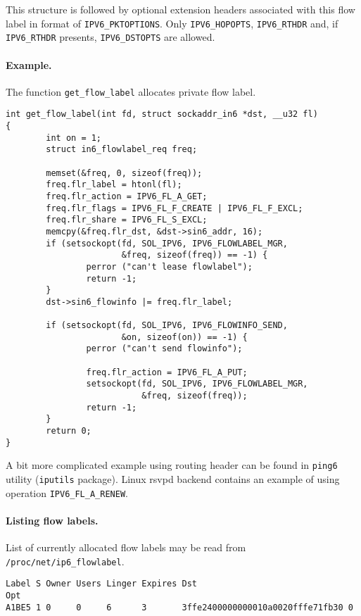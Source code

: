 This structure is followed by optional extension headers associated
with this flow label in format of \verb|IPV6_PKTOPTIONS|. Only
\verb|IPV6_HOPOPTS|, \verb|IPV6_RTHDR| and, if \verb|IPV6_RTHDR| presents,
\verb|IPV6_DSTOPTS| are allowed.

\paragraph{Example.}
 The function \verb|get_flow_label| allocates
private flow label.

\begin{verbatim}
int get_flow_label(int fd, struct sockaddr_in6 *dst, __u32 fl)
{
        int on = 1;
        struct in6_flowlabel_req freq;

        memset(&freq, 0, sizeof(freq));
        freq.flr_label = htonl(fl);
        freq.flr_action = IPV6_FL_A_GET;
        freq.flr_flags = IPV6_FL_F_CREATE | IPV6_FL_F_EXCL;
        freq.flr_share = IPV6_FL_S_EXCL;
        memcpy(&freq.flr_dst, &dst->sin6_addr, 16);
        if (setsockopt(fd, SOL_IPV6, IPV6_FLOWLABEL_MGR,
                       &freq, sizeof(freq)) == -1) {
                perror ("can't lease flowlabel");
                return -1;
        }
        dst->sin6_flowinfo |= freq.flr_label;

        if (setsockopt(fd, SOL_IPV6, IPV6_FLOWINFO_SEND,
                       &on, sizeof(on)) == -1) {
                perror ("can't send flowinfo");

                freq.flr_action = IPV6_FL_A_PUT;
                setsockopt(fd, SOL_IPV6, IPV6_FLOWLABEL_MGR,
                           &freq, sizeof(freq));
                return -1;
        }
        return 0;
}
\end{verbatim}

A bit more complicated example using routing header can be found
in \verb|ping6| utility (\verb|iputils| package). Linux rsvpd backend
contains an example of using operation \verb|IPV6_FL_A_RENEW|.

\paragraph{Listing flow labels.} 
List of currently allocated
flow labels may be read from \verb|/proc/net/ip6_flowlabel|.

\begin{verbatim}
Label S Owner Users Linger Expires Dst                              Opt
A1BE5 1 0     0     6      3       3ffe2400000000010a0020fffe71fb30 0
\end{verbatim}

